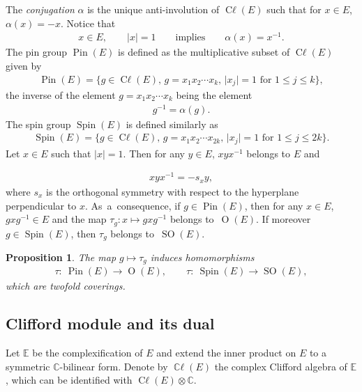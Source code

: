 \documentclass[pdftex]{sigma}
\DeclareMathOperator{\cl}{C\ell} %
\DeclareMathOperator{\ccl}{\mathbb{C}\ell} %
\DeclareMathOperator{\Spin}{Spin}
\DeclareMathOperator{\Pin}{Pin}
\DeclareMathOperator{\Or}{O}
\DeclareMathOperator{\SO}{SO}
\numberwithin{equation}{section}
\newtheorem{prop}[theor]{Proposition}
\begin{document}
 The \emph{conjugation} $\alpha$ is the unique anti-involution of $\cl(E)$
such that for $x\in E$, $\alpha(x) = -x$. Notice that
\begin{gather*}
x\in E,\qquad \vert x\vert = 1 \qquad \text{implies} \qquad \alpha(x) = x^{-1}.
\end{gather*}
The {pin group} $\Pin(E)$ is defined as the multiplicative subset of $\cl(E)$ given by
\begin{gather*}
\Pin(E) = \{g\in \cl(E),\, g= x_1x_2\cdots x_{k},\, \vert x_j\vert = 1 \text{ for } 1\leq j\leq k\} ,
\end{gather*}
the inverse of the element $g=x_1x_2\cdots x_{k}$ being the element
 \begin{gather*}
g^{-1} = \alpha(g) .
\end{gather*}
The {spin group} $\Spin(E)$ is defined similarly as
\begin{gather*}
\Spin(E) = \{g\in \cl(E),\, g= x_1x_2\cdots x_{2k},\, \vert x_j\vert = 1 \text{ for } 1\leq j\leq 2k\}.
\end{gather*}
Let $x\in E$ such that $\vert x\vert = 1$. Then for any $y\in E$, $xyx^{-1}$ belongs to $E$ and
{\sloppy\begin{gather*}
xyx^{-1} = -s_x y,
\end{gather*}
where $s_x$ is the orthogonal symmetry with respect to the hyperplane perpendicular to $x$. As~a~con\-sequence, if $g\in \Pin(E)$, then for any $x\in E$, $gxg^{-1}\in E$ and the map $\tau_g \colon x\mapsto gxg^{-1}$ belongs to~$\Or(E)$. If moreover $g\in \Spin(E)$, then $\tau_g$ belongs to~$\SO(E)$.

}

\begin{prop} The map $g\mapsto \tau_g$ induces homomorphisms
\begin{gather*}
\tau \colon\ \Pin(E) \to \Or(E), \qquad \tau \colon\ \Spin(E) \to\SO(E),
\end{gather*}
 which are twofold coverings.
\end{prop}

\subsection{Clifford module and its dual}

Let $\mathbb E$ be the complexification of $E$ and extend the inner product on $E$ to a symmetric $\mathbb C$-bi\-li\-near form. Denote by $\ccl(E)$ the complex Clifford algebra of $\mathbb E$, which can be identified with $\cl(E)\otimes \mathbb C$.
\end{document}
